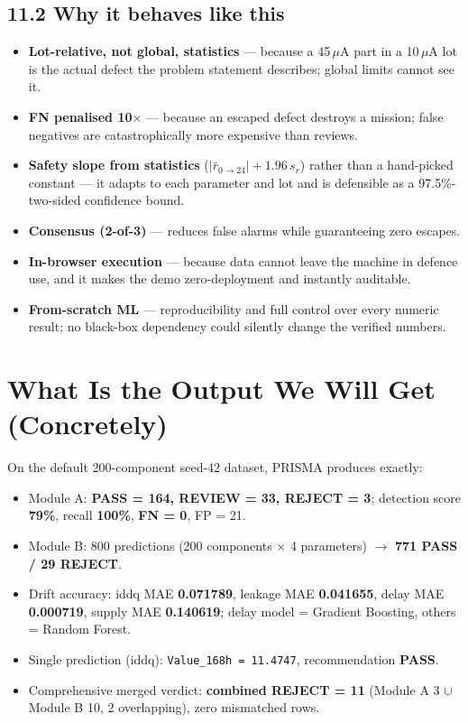 \documentclass[11pt,a4paper]{article}
\newcommand{\code}[1]{\texttt{\small #1}}
\newcommand{\keys}[1]{\textbf{\sffamily#1}}
\newcommand{\resultbox}[1]{\par\vspace{0.6em}\noindent
  \begin{tcolorbox}[colback=solgreen!8,colframe=solgreen,
    title={\sffamily\bfseries\color{white}Verified Result},arc=2pt,boxrule=1pt]
    #1
  \end{tcolorbox}\par\vspace{0.4em}}
\begin{document}
\subsection*{11.2 Why it behaves like this}
\begin{itemize}[leftmargin=1.5em]
  \item \textbf{Lot-relative, not global, statistics} --- because a 45\,$\mu$A part in a 10\,$\mu$A
        lot is the actual defect the problem statement describes; global limits cannot see it.
  \item \textbf{FN penalised 10$\times$} --- because an escaped defect destroys a mission; false
        negatives are catastrophically more expensive than reviews.
  \item \textbf{Safety slope from statistics} ($|\bar{r}_{0\rightarrow24}|+1.96\,s_r$) rather than a
        hand-picked constant --- it adapts to each parameter and lot and is defensible as a
        97.5\%-two-sided confidence bound.
  \item \textbf{Consensus (2-of-3)} --- reduces false alarms while guaranteeing zero escapes.
  \item \textbf{In-browser execution} --- because data cannot leave the machine in defence use, and
        it makes the demo zero-deployment and instantly auditable.
  \item \textbf{From-scratch ML} --- reproducibility and full control over every numeric result;
        no black-box dependency could silently change the verified numbers.
\end{itemize}

\section{What Is the Output We Will Get (Concretely)}

\resultbox{
  On the default 200-component seed-42 dataset, PRISMA produces exactly:
  \begin{itemize}[leftmargin=1.5em]
    \item Module A: \textbf{PASS = 164, REVIEW = 33, REJECT = 3};
          detection score \textbf{79\%}, recall \textbf{100\%}, \textbf{FN = 0}, FP = 21.
    \item Module B: 800 predictions (200 components $\times$ 4 parameters) $\rightarrow$
          \textbf{771 PASS / 29 REJECT}.
    \item Drift accuracy: iddq MAE \textbf{0.071789}, leakage MAE \textbf{0.041655},
          delay MAE \textbf{0.000719}, supply MAE \textbf{0.140619}; delay model = Gradient
          Boosting, others = Random Forest.
    \item Single prediction (iddq): \code{Value\_168h = 11.4747}, recommendation \keys{PASS}.
    \item Comprehensive merged verdict: \textbf{combined REJECT = 11}
          (Module A 3 $\cup$ Module B 10, 2 overlapping), zero mismatched rows.
  \end{itemize}
}
\end{document}
